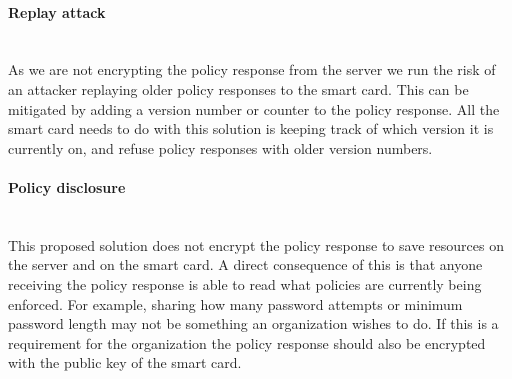 \paragraph{Replay attack}\mbox{}\\
As we are not encrypting the policy response from the server we run the risk of an attacker replaying older policy responses to the smart card. This can be mitigated by adding a version number or counter to the policy response. All the smart card needs to do with this solution is keeping track of which version it is currently on, and refuse policy responses with older version numbers.

\paragraph{Policy disclosure}\mbox{}\\
This proposed solution does not encrypt the policy response to save resources on the server and on the smart card. A direct consequence of this is that anyone receiving the policy response is able to read what policies are currently being enforced. For example, sharing how many password attempts or minimum password length may not be something an organization wishes to do. If this is a requirement for the organization the policy response should also be encrypted with the public key of the smart card.





